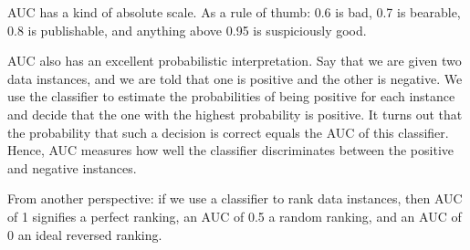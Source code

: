 AUC has a kind of absolute scale. As a rule of thumb: 0.6 is bad, 0.7 is bearable, 0.8 is publishable, and anything above 0.95 is suspiciously good.

AUC also has an excellent probabilistic interpretation. Say that we are given two data instances, and we are told that one is positive and the other is negative. We use the classifier to estimate the probabilities of being positive for each instance and decide that the one with the highest probability is positive. It turns out that the probability that such a decision is correct equals the AUC of this classifier. Hence, AUC measures how well the classifier discriminates between the positive and negative instances.

From another perspective: if we use a classifier to rank data instances, then AUC of 1 signifies a perfect ranking, an AUC of 0.5 a random ranking, and an AUC of 0 an ideal reversed ranking.
